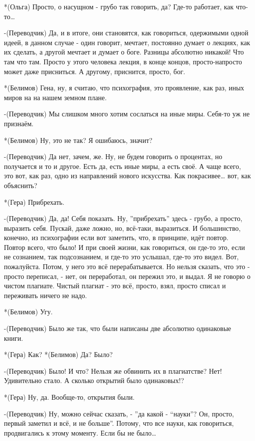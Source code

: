 *(Ольга)  Просто, о насущном - грубо так говорить, да? Где-то работает, как что-то… 

-(Переводчик) Да, и в итоге, они становятся, как говориться, одержимыми одной идеей, в данном случае - один говорит, мечтает, постоянно думает о лекциях, как их сделать, а другой  мечтает и думает о боге.  Разницы абсолютно никакой! Что там что там. Просто у этого человека лекция, в конце концов, просто-напросто может даже присниться. А другому,  приснится, просто, бог.

*(Белимов) Гена, ну, я считаю, что психография, это проявление, как раз, иных миров на на нашем земном плане. 

-(Переводчик) Мы слишком много хотим сослаться на иные миры. Себя-то уж не признаём.

*(Белимов) Ну, это не так? Я ошибаюсь, значит?

-(Переводчик) Да нет, зачем, же. Ну, не будем говорить о процентах, но получается и то и другое. Есть да, есть иные миры, а есть своё.  А чаще всего, это вот, как раз, одно из направлений нового искусства. Как покрасивее… вот, как объяснить?

*(Гера) Прибрехать.

-(Переводчик) Да, да! Себя показать. Ну, ”прибрехать” здесь - грубо, а просто, выразить себя. Пускай, даже ложно, но, всё-таки, выразиться. И большинство, конечно, из психографии если вот заметить, что, в принципе, идёт повтор. Повтор всего, что было! И при своей жизни, как говориться, он где-то это, если не сознанием, так подсознанием, и где-то это услышал, где-то это видел. Вот, пожалуйста. Потом, у него это всё  перерабатывается. Но нельзя сказать, что это -  просто переписал, - нет, он переработал, он пережил это, и выдал. Я не говорю о чистом плагиате. Чистый плагиат - это всё, просто, взял, просто списал и переживать ничего не надо. 

*(Белимов) Угу.

-(Переводчик) Было же так, что были написаны две абсолютно одинаковые книги.

*(Гера) Как?
*(Белимов) Да? Было?

-(Переводчик) Было! И что? Нельзя же обвинить их в плагиатстве? Нет! Удивительно стало. А сколько открытий было одинаковых!?

*(Гера) Ну, да. Вообще-то, открытия были.

-(Переводчик) Ну, можно сейчас сказать, - ”да какой - “науки”? Он, просто, первый заметил и всё, и не больше”. Потому, что все науки, как говориться, продвигались к этому моменту. Если бы не было… 

